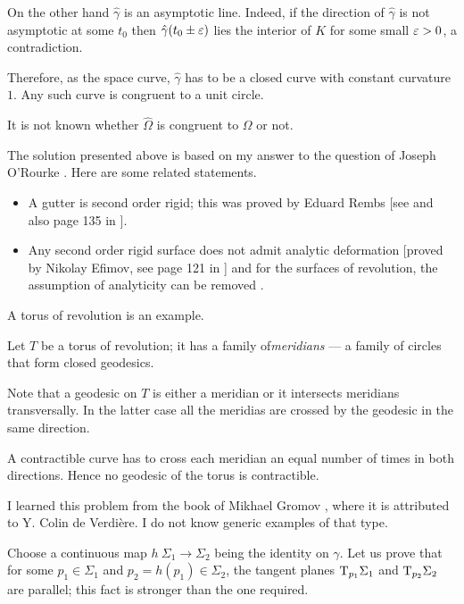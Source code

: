 On the other hand $\hat\gamma$ is an asymptotic line.
Indeed, if the direction of $\hat\gamma$ is not asymptotic at some $t_0$
then $\hat\gamma(t_0 \pm\varepsilon)$ lies the interior of $K$ for some small $\varepsilon>0$, a contradiction.

Therefore, as the space curve,
$\hat\gamma$ has to be a closed curve with constant curvature $1$.
Any such curve is congruent to a unit circle.\qeds

It is not known whether $\hat\Omega$ is congruent to $\Omega$ or not.

The solution presented above is based on my answer 
to the question of Joseph O'Rourke \cite[see][]{rourke}.
Here are some related statements.
\begin{itemize}
\item A gutter is second order rigid;
this was proved by Eduard Rembs
[see  and also page 135 in ].
\item Any second order rigid surface does not admit analytic deformation 
[proved by Nikolay Efimov, see page 121 in ]
and for the surfaces of revolution, the assumption of analyticity can be removed 
\cite[proved by Idzhad Sabitov, see][]{sabitov}.
\end{itemize}









A torus of revolution is an example.

\medskip

Let $T$ be a torus of revolution;
it has a family of{}\emph{meridians} --- a family of circles that form closed geodesics.

Note that a geodesic on $T$ is either a meridian
or it intersects meridians transversally.
In the latter case all the meridias are crossed by the geodesic in the same direction.

A contractible curve has to cross each meridian an equal number of times in both directions.
Hence no geodesic of the torus is contractible.\qeds 




I learned this problem 
from the book of Mikhael Gromov \cite[see][]{gromov-MetStr},
where it is attributed to Y. Colin de Verdi\`ere.
I do not know generic examples of that type.

Choose a continuous map $h\:\Sigma_1\to \Sigma_2$
being the identity on $\gamma$.
Let us prove that for some $p_1\in \Sigma_1$ and $p_2=h(p_1)\in \Sigma_2$,
the tangent planes $\mathrm{T}_{p_1} \Sigma_1$ and  $\mathrm{T}_{p_2} \Sigma_2$ are parallel;
this fact is stronger than the one required.

